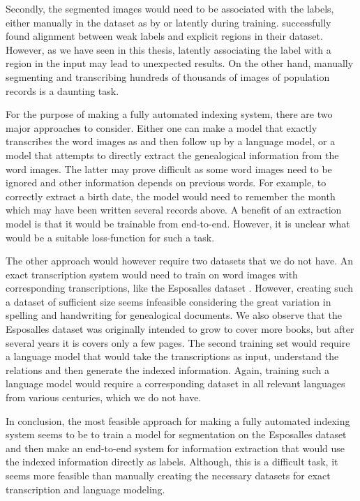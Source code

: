 Secondly, the segmented images would need to be associated with the labels, either manually in the dataset as by \textcite{esposalles} or latently during training.
\textcite{VisualSemanticAlignment} successfully found alignment between weak labels and explicit regions in their dataset. However, as we have seen in this thesis, latently associating the label with a region in the input may lead to unexpected results. On the other hand, manually segmenting and transcribing hundreds of thousands of images of population records is a daunting task.

For the purpose of making a fully automated indexing system, there are two major approaches to consider. Either one can make a model that exactly transcribes the word images as \textcite{FornesCnnCategorization} and then follow up by a language model, or a model that attempts to directly extract the genealogical information from the word images. The latter may prove difficult as some word images need to be ignored and other information depends on previous words. For example, to correctly extract a birth date, the model would need to remember the month which may have been written several records above.
A benefit of an extraction model is that it would be trainable from end-to-end. However, it is unclear what would be a suitable loss-function for such a task.

The other approach would however require two datasets that we do not have. An exact transcription system would need to train on word images with corresponding transcriptions, like the Esposalles dataset \cite{esposalles}. However, creating such a dataset of sufficient size seems infeasible considering the great variation in spelling and handwriting for genealogical documents. We also observe that the Esposalles dataset was originally intended to grow to cover more books, but after several years it is covers only a few pages. The second training set would require a language model that would take the transcriptions as input, understand the relations and then generate the indexed information. Again, training such a language model would require a corresponding dataset in all relevant languages from various centuries, which we do not have.

In conclusion, the most feasible approach for making a fully automated indexing system seems to be to train a model for segmentation on the Esposalles dataset \cite{esposalles} and then make an end-to-end system for information extraction that would use the indexed information directly as labels. Although, this is a difficult task, it seems more feasible than manually creating the necessary datasets for exact transcription and language modeling.

